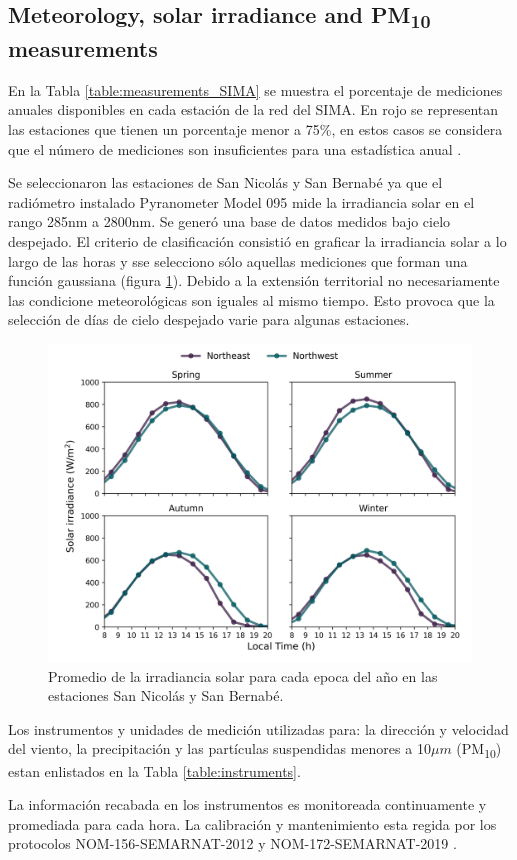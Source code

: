 \subsection{Meteorology, solar irradiance and PM\textsubscript{10} measurements}
En la Tabla \ref{table:measurements_SIMA} se muestra el porcentaje de mediciones anuales disponibles en cada estación de la red del SIMA. En rojo se representan las estaciones que tienen un porcentaje menor a 75\%, en estos casos se considera que el número de mediciones son insuficientes para una estadística anual \cite{molina2019}.

Se seleccionaron las estaciones de San Nicolás y San Bernabé ya que el radiómetro instalado Pyranometer Model 095 mide la irradiancia solar en el rango 285nm a 2800nm. Se generó una base de datos medidos bajo cielo despejado. El criterio de clasificación consistió en graficar la irradiancia solar a lo largo de las horas y sse selecciono sólo aquellas mediciones que forman una función gaussiana (figura \ref{fig:clear_days}). Debido a la extensión territorial no necesariamente las condicione meteorológicas son iguales al mismo tiempo. Esto provoca que la selección de días de cielo despejado varie para algunas estaciones.
\begin{figure}[H]
    \centering
    \includegraphics[scale=0.5]{images/Clear_days.png}
    \caption{Promedio de la irradiancia solar para cada epoca del año en las estaciones San Nicolás y San Bernabé.}
    \label{fig:clear_days}
\end{figure}
Los instrumentos y unidades de medición utilizadas para: la dirección y velocidad del viento, la precipitación y las partículas suspendidas menores a 10$\mu m$ (PM\textsubscript{10}) estan enlistados en la Tabla \ref{table:instruments}.

La información recabada en los instrumentos es monitoreada continuamente y promediada para cada hora. La calibración y mantenimiento esta regida por los protocolos NOM-156-SEMARNAT-2012 \cite{SEMARNAT2012} y NOM-172-SEMARNAT-2019 \cite{SEMARNAT2019}.